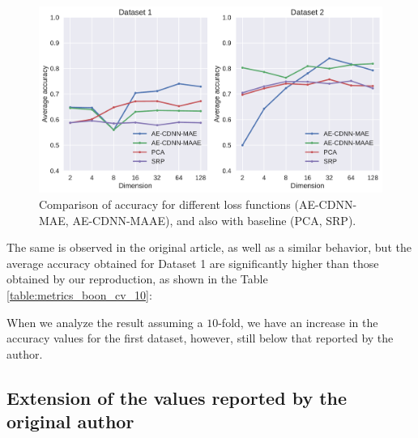 \begin{figure}[!ht]
\centering
\includegraphics[width=\linewidth]{figure/baseline_methods.pdf}
  \caption{Comparison of accuracy for different loss functions (AE-CDNN-MAE, AE-CDNN-MAAE), and also with baseline (PCA, SRP).}
\label{fig:baseline_methods}
\end{figure}

The same is observed in the original article, as well as a similar behavior, but the average accuracy obtained for Dataset 1 are significantly higher than those obtained by our reproduction, as shown in the Table \ref{table:metrics_boon_cv_10}:

\begin{table}[!ht]
\centering
{}
\caption{Accuracy in Classification, in the first dataset with $CV=10$.}
\label{table:metrics_boon_cv_10}
\end{table}

When we analyze the result assuming a $10$-fold, we have an increase in the accuracy values for the first dataset, however, still below that reported by the author.

\subsection{Extension of the values reported by the original author}
 
